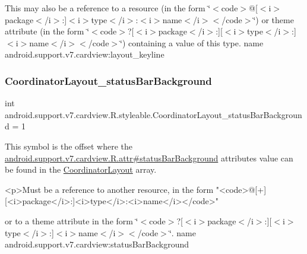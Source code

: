 This may also be a reference to a resource (in the form \char`\"{}$<$code$>$@\mbox{[}$<$i$>$package$<$/i$>$\+:\mbox{]}$<$i$>$type$<$/i$>$\+:$<$i$>$name$<$/i$>$$<$/code$>$\char`\"{}) or theme attribute (in the form \char`\"{}$<$code$>$?\mbox{[}$<$i$>$package$<$/i$>$\+:\mbox{]}\mbox{[}$<$i$>$type$<$/i$>$\+:\mbox{]}$<$i$>$name$<$/i$>$$<$/code$>$\char`\"{}) containing a value of this type.  name android.\+support.\+v7.\+cardview\+:layout\+\_\+keyline \mbox{\label{classandroid_1_1support_1_1v7_1_1cardview_1_1R_1_1styleable_a3e4084475fab0e54b108b676c93f7eb7}} 
\subsubsection{\texorpdfstring{Coordinator\+Layout\+\_\+status\+Bar\+Background}{CoordinatorLayout\_statusBarBackground}}
{\footnotesize\ttfamily int android.\+support.\+v7.\+cardview.\+R.\+styleable.\+Coordinator\+Layout\+\_\+status\+Bar\+Background = 1\hspace{0.3cm}{\ttfamily [static]}}

This symbol is the offset where the \hyperlink{classandroid_1_1support_1_1v7_1_1cardview_1_1R_1_1attr_a7089720b877cb43531e27184cd06867b}{android.\+support.\+v7.\+cardview.\+R.\+attr\#status\+Bar\+Background} attribute\textquotesingle{}s value can be found in the \hyperlink{classandroid_1_1support_1_1v7_1_1cardview_1_1R_1_1styleable_af6588adcd8d900f07f32f7bc3055e04d}{Coordinator\+Layout} array.

\begin{DoxyVerb}      <p>Must be a reference to another resource, in the form "<code>@[+][<i>package</i>:]<i>type</i>:<i>name</i></code>"
\end{DoxyVerb}
 or to a theme attribute in the form \char`\"{}$<$code$>$?\mbox{[}$<$i$>$package$<$/i$>$\+:\mbox{]}\mbox{[}$<$i$>$type$<$/i$>$\+:\mbox{]}$<$i$>$name$<$/i$>$$<$/code$>$\char`\"{}.  name android.\+support.\+v7.\+cardview\+:status\+Bar\+Background \mbox{\label{classandroid_1_1support_1_1v7_1_1cardview_1_1R_1_1styleable_af2ab89f285aaee8ac3e0729dec94e16d}} 

